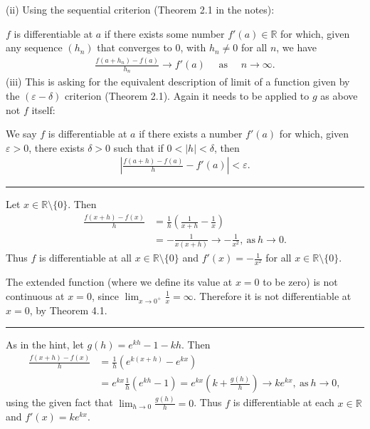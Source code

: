 \documentclass[letterpaper,10pt,english]{jupyterBook}
\begin{document}
\sphinxAtStartPar
(ii) Using the sequential criterion (Theorem 2.1 in the notes):

\(f\) is differentiable at \(a\) if there exists some number \(f'(a) \in \mathbb{R}\) for which, given any sequence \((h_{n})\) that converges to \(0\), with \(h_n\neq 0\) for all \(n\), we have
\begin{equation*}
\begin{split}
\frac{f(a + h_{n}) - f(a)}{h_{n}} \rightarrow f'(a) \hspace{1em} \text{ as } \hspace{1em} n\rightarrow\infty.
\end{split}
\end{equation*}
\sphinxAtStartPar
(iii) This is asking for the equivalent description of limit of a function given by the \((\varepsilon - \delta)\) criterion (Theorem 2.1). Again it needs to be applied to \(g\) as above not \(f\) itself:

We say \(f\) is differentiable at \(a\) if there exists a number \(f'(a)\) for which, given \(\varepsilon>0\), there exists \(\delta > 0\) such that if \(0<|h| < \delta\), then
\begin{equation*}
\begin{split}
\left|\displaystyle\frac{f(a+h) - f(a)}{h} - f'(a)\right| < \varepsilon.
\end{split}
\end{equation*}

\bigskip\hrule\bigskip


\sphinxAtStartPar
{\hyperref[\detokenize{Problems:id39}]{}} Let \(x\in\mathbb{R}\setminus\{0\}\). Then
\begin{align*}
\frac{f(x + h) -f(x)}{h} &= \frac{1}{h}\left(\frac{1}{x+ h} -\frac{1}{x}\right)\\
&= -\frac{1}{x(x+h)} \rightarrow -\frac{1}{x^{2}},~\mbox{as}~h \rightarrow 0. 
\end{align*}
\sphinxAtStartPar
Thus \(f\) is differentiable at all \(x\in\mathbb{R}\setminus\{0\}\) and \(f'(x)=-\frac{1}{x^2}\) for all \(x\in\mathbb{R}\setminus\{0\}\).

The extended function (where we define its value at \(x=0\) to be zero) is not continuous at \(x=0\), since \(\lim_{x \rightarrow 0^+}\frac{1}{x} =\infty\). Therefore it is not differentiable at \(x=0\), by Theorem 4.1.


\bigskip\hrule\bigskip


\sphinxAtStartPar
{\hyperref[\detokenize{Problems:id40}]{}} As in the hint, let \(g(h) = e^{kh} - 1 - kh \). Then
\begin{align*}
\frac{f(x + h) -f(x)}{h} &= \frac{1}{h}(e^{k(x +h)} - e^{kx})\\
&= e^{kx}\frac{1}{h}(e^{kh} - 1) = e^{kx}\left(k + \frac{g(h)}{h}\right) \rightarrow ke^{kx},~\mbox{as}~h \rightarrow 0,
\end{align*}
\sphinxAtStartPar
using the given fact that  \(\lim_{h \rightarrow 0}\frac{g(h)}{h} = 0\). Thus \(f\) is differentiable at each \(x\in\mathbb{R}\) and \(f'(x)=ke^{kx}\).
\end{document}

